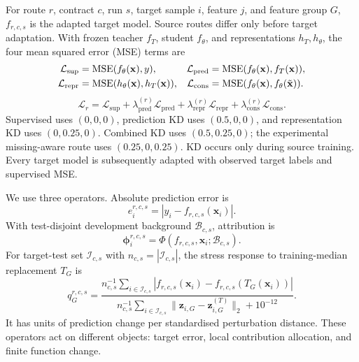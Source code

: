 \documentclass[runningheads]{venue/lncs/llncs}
\begin{document}
For route $r$, contract $c$, run $s$, target sample $i$, feature $j$, and feature group $G$, $f_{r,c,s}$ is the adapted target model. Source routes differ only before target adaptation. With frozen teacher $f_T$, student $f_\theta$, and representations $h_T,h_\theta$, the four mean squared error (MSE) terms are
\begin{equation}
\label{eq:component-losses}
\begin{aligned}
\mathcal{L}_{\rm sup}&=\operatorname{MSE}(f_\theta(\mathbf{x}),y), &
\mathcal{L}_{\rm pred}&=\operatorname{MSE}(f_\theta(\mathbf{x}),f_T(\mathbf{x})),\\
\mathcal{L}_{\rm repr}&=\operatorname{MSE}(h_\theta(\mathbf{x}),h_T(\mathbf{x})), &
\mathcal{L}_{\rm cons}&=\operatorname{MSE}(f_\theta(\mathbf{x}),f_\theta(\tilde{\mathbf{x}})).
\end{aligned}
\end{equation}
\begin{equation}
\label{eq:route-loss}
\mathcal{L}_{r}=\mathcal{L}_{\mathrm{sup}}+\lambda_{\mathrm{pred}}^{(r)}\!\mathcal{L}_{\mathrm{pred}}+\lambda_{\mathrm{repr}}^{(r)}\!\mathcal{L}_{\mathrm{repr}}+\lambda_{\mathrm{cons}}^{(r)}\!\mathcal{L}_{\mathrm{cons}} .
\end{equation}
Supervised uses $(0,0,0)$, prediction KD uses $(0.5,0,0)$, and representation KD uses $(0,0.25,0)$. Combined KD uses $(0.5,0.25,0)$; the experimental missing-aware route uses $(0.25,0,0.25)$. KD occurs only during source training. Every target model is subsequently adapted with observed target labels and supervised MSE.

We use three operators. Absolute prediction error is
\begin{equation}
\label{eq:absolute-error}
e_i^{r,c,s}=|y_i-f_{r,c,s}(\mathbf{x}_i)|.
\end{equation}
With test-disjoint development background $\mathcal{B}_{c,s}$, attribution is
\begin{equation}
\label{eq:attribution}
\boldsymbol{\phi}_i^{r,c,s}=\Phi(f_{r,c,s},\mathbf{x}_i;\mathcal{B}_{c,s}).
\end{equation}
For target-test set $\mathcal{I}_{c,s}$ with $n_{c,s}=|\mathcal{I}_{c,s}|$, the stress response to training-median replacement $T_G$ is
\begin{equation}
\label{eq:stress}
q_G^{r,c,s}=\frac{n_{c,s}^{-1}\sum_{i\in\mathcal I_{c,s}}|f_{r,c,s}(\mathbf{x}_i)-f_{r,c,s}(T_G(\mathbf{x}_i))|}{n_{c,s}^{-1}\sum_{i\in\mathcal I_{c,s}}\|\mathbf{z}_{i,G}-\mathbf{z}_{i,G}^{(T)}\|_2+10^{-12}}.
\end{equation}
It has units of prediction change per standardised perturbation distance. These operators act on different objects: target error, local contribution allocation, and finite function change.
\end{document}
